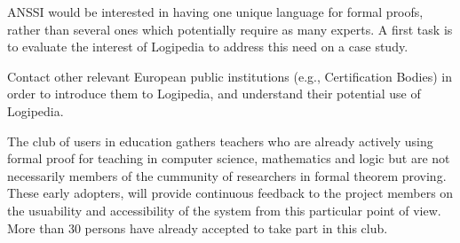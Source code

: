 \begin{workpackage}[id=dissemination,type=MGT,
  short={Dissemination},
  title={Dissemination, communication and exploitation},
  lead=Inr,InrRM=12,BirRM=4,IrtRM=4,ImtRM=2,StrRM=2,ZibRM=14,EduRM=12]
\begin{tasklist}
\begin{task}[id=certifiers-club,
      title=Promoting the use of Logipedia by certification
      authorities, lead=Imt,ImtRM=2,wphases=7-42!.05]
    \begin{compactitem}
    \item  ANSSI would be interested in having one unique language for formal
proofs, rather than several ones which potentially require as many
experts. A first task is to evaluate the interest of Logipedia to address
this need on a case study.
\item Contact other relevant European public institutions
(e.g., Certification Bodies) in order to introduce them to Logipedia,
and understand their potential use of Logipedia.
    \end{compactitem}
  \end{task}

  \begin{task}[id=teachers-club,
      title=Expanding the use of Logipedia in education,
      lead=Str,StrRM=2,wphases=7-42!.05] The club of users in education gathers
    teachers who are already actively using formal proof for teaching
    in computer science, mathematics and logic but are not necessarily
    members of the cummunity of researchers in formal theorem
    proving. These early adopters, will provide continuous feedback to
    the project members on the usuability and accessibility of the
    system from this particular point of view.  More than 30 persons
    have already accepted to take part in this club.




\end{task}
\end{tasklist}
\end{workpackage}
